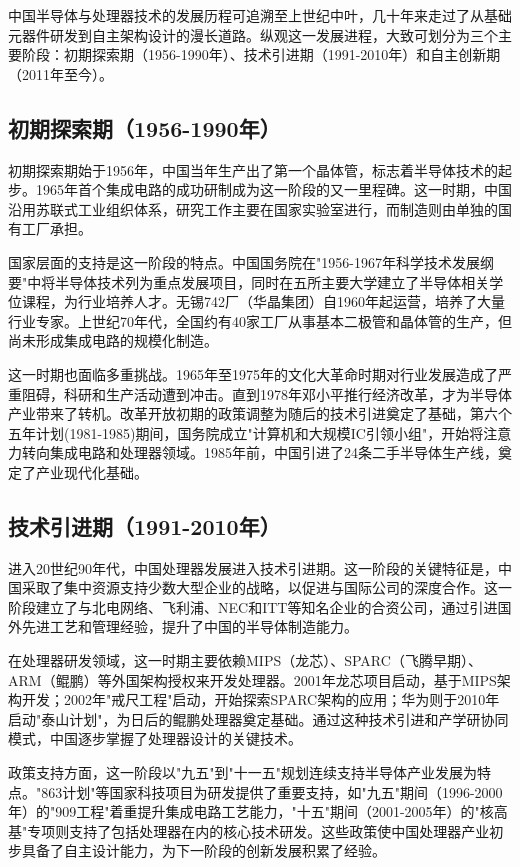\documentclass[a4paper,colorlinks=true,linkcolor=blue,urlcolor=blue,citecolor=green,bookmarks=true]{article}
\begin{document}
中国半导体与处理器技术的发展历程可追溯至上世纪中叶，几十年来走过了从基础元器件研发到自主架构设计的漫长道路。纵观这一发展进程，大致可划分为三个主要阶段：初期探索期（1956-1990年）、技术引进期（1991-2010年）和自主创新期（2011年至今）。

\subsection{初期探索期（1956-1990年）}

初期探索期始于1956年，中国当年生产出了第一个晶体管，标志着半导体技术的起步。1965年首个集成电路的成功研制成为这一阶段的又一里程碑。这一时期，中国沿用苏联式工业组织体系，研究工作主要在国家实验室进行，而制造则由单独的国有工厂承担。

国家层面的支持是这一阶段的特点。中国国务院在"1956-1967年科学技术发展纲要"中将半导体技术列为重点发展项目，同时在五所主要大学建立了半导体相关学位课程，为行业培养人才。无锡742厂（华晶集团）自1960年起运营，培养了大量行业专家\cite{17}\cite{3}。上世纪70年代，全国约有40家工厂从事基本二极管和晶体管的生产，但尚未形成集成电路的规模化制造。

这一时期也面临多重挑战。1965年至1975年的文化大革命时期对行业发展造成了严重阻碍，科研和生产活动遭到冲击。直到1978年邓小平推行经济改革，才为半导体产业带来了转机。改革开放初期的政策调整为随后的技术引进奠定了基础，第六个五年计划(1981-1985)期间，国务院成立"计算机和大规模IC引领小组"，开始将注意力转向集成电路和处理器领域。1985年前，中国引进了24条二手半导体生产线，奠定了产业现代化基础\cite{17}\cite{3}。

\subsection{技术引进期（1991-2010年）}

进入20世纪90年代，中国处理器发展进入技术引进期。这一阶段的关键特征是，中国采取了集中资源支持少数大型企业的战略，以促进与国际公司的深度合作。这一阶段建立了与北电网络、飞利浦、NEC和ITT等知名企业的合资公司，通过引进国外先进工艺和管理经验，提升了中国的半导体制造能力。

在处理器研发领域，这一时期主要依赖MIPS（龙芯）、SPARC（飞腾早期）、ARM（鲲鹏）等外国架构授权来开发处理器。2001年龙芯项目启动，基于MIPS架构开发；2002年"戒尺工程"启动，开始探索SPARC架构的应用；华为则于2010年启动"泰山计划"，为日后的鲲鹏处理器奠定基础。通过这种技术引进和产学研协同模式，中国逐步掌握了处理器设计的关键技术\cite{6}\cite{7}\cite{13}\cite{17}\cite{10}\cite{5}\cite{8}。

政策支持方面，这一阶段以"九五"到"十一五"规划连续支持半导体产业发展为特点。"863计划"等国家科技项目为研发提供了重要支持，如"九五"期间（1996-2000年）的"909工程"着重提升集成电路工艺能力，"十五"期间（2001-2005年）的"核高基"专项则支持了包括处理器在内的核心技术研发。这些政策使中国处理器产业初步具备了自主设计能力，为下一阶段的创新发展积累了经验\cite{17}\cite{8}\cite{3}\cite{3}。
\end{document}
